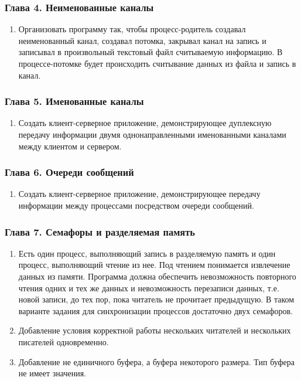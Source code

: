 \documentclass[14pt,a4paper,report]{report}
\begin{document}
\subsubsection{Глава 4. Неименованные каналы}

\begin{enumerate}
	\item Организовать программу так, чтобы процесс-родитель создавал неименованный канал, создавал потомка, закрывал канал на запись и записывал в произвольный текстовый файл считываемую информацию. В процессе-потомке будет происходить считывание данных из файла и запись в канал.
\end{enumerate}

\subsubsection{Глава 5. Именованные каналы}

\begin{enumerate}
	\item Создать клиент-серверное приложение, демонстрирующее дуплексную передачу информации двумя однонаправленными именованными каналами между клиентом и сервером.
\end{enumerate}

\subsubsection{Глава 6. Очереди сообщений}

\begin{enumerate}
	\item Создать клиент-серверное приложение, демонстрирующее передачу информации между процессами посредством очереди сообщений.
\end{enumerate}

\subsubsection{Глава 7. Семафоры и разделяемая память}

\begin{enumerate}
	\item Есть один процесс, выполняющий запись в разделяемую память и один процесс, выполняющий чтение из нее. Под чтением понимается извлечение данных из памяти. Программа должна обеспечить невозможность повторного чтения одних и тех же данных и невозможность перезаписи данных, т.е. новой записи, до тех пор, пока читатель не прочитает предыдущую. В таком варианте задания для синхронизации процессов достаточно двух семафоров.
	\item Добавление условия корректной работы нескольких читателей и нескольких писателей одновременно.
	\item Добавление не единичного буфера, а буфера некоторого размера. Тип буфера не имеет значения.
\end{enumerate}
\end{document}
